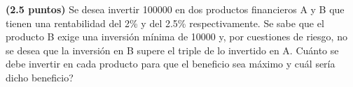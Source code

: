 
\textbf{(2.5 puntos)} Se desea invertir 100000 \texteuro{} en dos productos financieros A y B que tienen una rentabilidad del 2\% y del 2.5\% respectivamente. Se sabe que el producto B exige una inversión mínima de 10000 \texteuro{} y, por cuestiones de riesgo, no se desea que la inversión en B supere el triple de lo invertido en A. \textquestiondown{}Cuánto se debe invertir en cada producto para que el beneficio sea máximo y cuál sería dicho beneficio?
